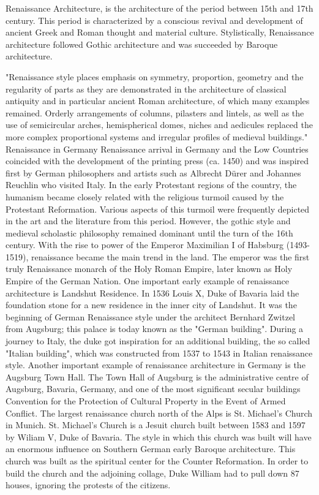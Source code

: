 Renaissance Architecture, is the architecture of the period between 15th and 17th century. This period is characterized by a conscious revival and development of ancient Greek and Roman thought and material culture.
Stylistically, Renaissance architecture followed Gothic architecture and was succeeded by Baroque architecture.

"Renaissance style places emphasis on symmetry, proportion, geometry and the regularity of parts as they are demonstrated in the architecture of classical antiquity and in particular ancient Roman architecture, of which many examples remained. Orderly arrangements of columns, pilasters and lintels, as well as the use of semicircular arches, hemispherical domes, niches and aedicules replaced the more complex proportional systems and irregular profiles of medieval buildings."
Renaissance in Germany
Renaissance arrival in Germany and the Low Countries coincided with the development of the printing press (ca. 1450) and was inspired first by German philosophers and artists such as Albrecht Dürer and Johannes Reuchlin who visited Italy.
In the early Protestant regions of the country, the humanism became closely related with the religious turmoil caused by the Protestant Reformation. Various aspects of this turmoil were frequently depicted in the art and the literature from this period. However, the gothic style and medieval scholastic philosophy remained dominant until the turn of the 16th century. With the rise to power of the Emperor Maximilian I of Habsburg (1493-1519), renaissance became the main trend in the land. The emperor was the first truly Renaissance monarch of the Holy Roman Empire, later known as Holy Empire of the German Nation.
One important early example of renaissance architecture is Landshut Residence. In 1536 Louis X, Duke of Bavaria laid the foundation stone for a new residence in the inner city of Landshut. It was the beginning of German Renaissance style under the architect Bernhard Zwitzel from Augsburg; this palace is today known as the "German building". During a journey to Italy, the duke got inspiration for an additional building, the so called "Italian building", which was constructed from 1537 to 1543 in Italian renaissance style.
Another important example of renaissance architecture in Germany is the Augsburg Town Hall. The Town Hall of Augsburg is the administrative centre of Augsburg, Bavaria, Germany, and one of the most significant secular buildings Convention for the Protection of Cultural Property in the Event of Armed Conflict.
The largest renaissance church north of the Alps is St. Michael's Church in Munich. St. Michael's Church is a Jesuit church built between 1583 and 1597 by Wiliam V, Duke of Bavaria. The style in which this church was built will have an enormous influence on Southern German early Baroque architecture. This church was built as the spiritual center for the Counter Reformation. In order to build the church and the adjoining collage, Duke William had to pull down 87 houses, ignoring the protests of the citizens.
